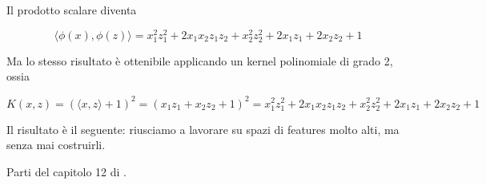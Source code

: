 \noindent
Il prodotto scalare diventa

$$\langle \phi(x), \phi(z)\rangle = x_1^2 z_1^2 + 2x_1 x_2 z_1 z_2 + x_2^2 z_2^2 + 2x_1 z_1 + 2x_2 z_2 + 1$$

\noindent
Ma lo stesso risultato è ottenibile applicando un kernel polinomiale di grado 2, ossia

$$K(x,z) = (\langle x,z\rangle + 1)^2 = (x_1 z_1 + x_2 z_2 + 1)^2 = x_1^2 z_1^2 + 2x_1 x_2 z_1 z_2 + x_2^2 z_2^2 + 2x_1 z_1 + 2x_2 z_2 + 1$$

Il risultato è il seguente: riusciamo a lavorare su spazi di features molto alti, ma senza mai costruirli. 

\newpage

Parti del capitolo 12 di \cite{Deisenroth2020MML}.